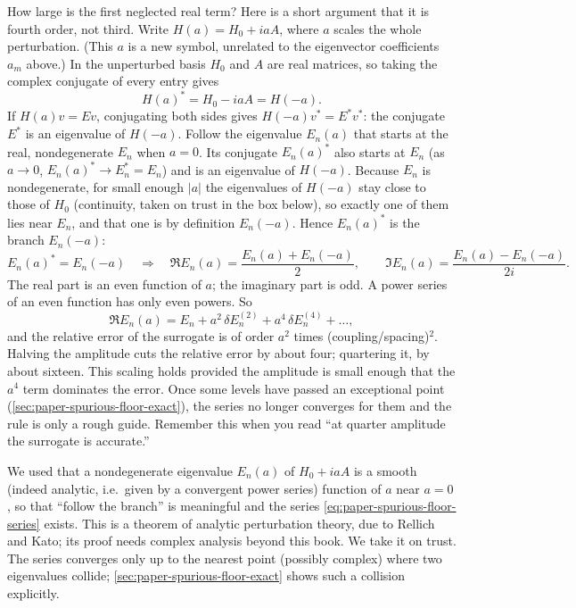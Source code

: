 How large is the first neglected real term? Here is a short argument that it is fourth order, not third. Write $H(a)=H_0+iaA$, where $a$ scales the whole perturbation. (This $a$ is a new symbol, unrelated to the eigenvector coefficients $a_m$ above.) In the unperturbed basis $H_0$ and $A$ are real matrices, so taking the complex conjugate of every entry gives
\begin{equation}
H(a)^*=H_0-iaA=H(-a).\label{eq:paper-spurious-floor-conj}
\end{equation}
If $H(a)v=Ev$, conjugating both sides gives $H(-a)v^*=E^*v^*$: the conjugate $E^*$ is an eigenvalue of $H(-a)$. Follow the eigenvalue $E_n(a)$ that starts at the real, nondegenerate $E_n$ when $a=0$. Its conjugate $E_n(a)^*$ also starts at $E_n$ (as $a\to0$, $E_n(a)^*\to E_n^*=E_n$) and is an eigenvalue of $H(-a)$. Because $E_n$ is nondegenerate, for small enough $|a|$ the eigenvalues of $H(-a)$ stay close to those of $H_0$ (continuity, taken on trust in the box below), so exactly one of them lies near $E_n$, and that one is by definition $E_n(-a)$. Hence $E_n(a)^*$ is the branch $E_n(-a)$:
\begin{equation}
E_n(a)^*=E_n(-a)\quad\Longrightarrow\quad
\Re E_n(a)=\frac{E_n(a)+E_n(-a)}{2},\qquad
\Im E_n(a)=\frac{E_n(a)-E_n(-a)}{2i}.\label{eq:paper-spurious-floor-even-odd}
\end{equation}
The real part is an even function of $a$; the imaginary part is odd. A power series of an even function has only even powers. So
\begin{equation}
\Re E_n(a)=E_n+a^2\,\delta E_n^{(2)}+a^4\,\delta E_n^{(4)}+\dots,\label{eq:paper-spurious-floor-series}
\end{equation}
and the relative error of the surrogate is of order $a^2$ times (coupling/spacing)$^2$. Halving the amplitude cuts the relative error by about four; quartering it, by about sixteen. This scaling holds provided the amplitude is small enough that the $a^4$ term dominates the error. Once some levels have passed an exceptional point (\cref{sec:paper-spurious-floor-exact}), the series no longer converges for them and the rule is only a rough guide. Remember this when you read ``at quarter amplitude the surrogate is accurate.''

\begin{beyond}
We used that a nondegenerate eigenvalue $E_n(a)$ of $H_0+iaA$ is a smooth (indeed analytic, i.e.\ given by a convergent power series) function of $a$ near $a=0$, so that ``follow the branch'' is meaningful and the series \cref{eq:paper-spurious-floor-series} exists. This is a theorem of analytic perturbation theory, due to Rellich and Kato; its proof needs complex analysis beyond this book. We take it on trust. The series converges only up to the nearest point (possibly complex) where two eigenvalues collide; \cref{sec:paper-spurious-floor-exact} shows such a collision explicitly.
\end{beyond}

